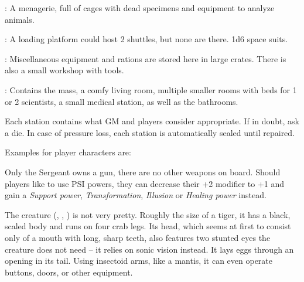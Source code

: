 {		: A menagerie, full of cages with dead specimens and equipment to analyze animals.

		: A loading platform could host 2 shuttles, but none are there. 1d6 space suits.

		: Miscellaneous equipment and rations are stored here in large crates. There is also a small workshop with tools.

		: Contains the mass, a comfy living room, multiple smaller rooms with beds for 1 or 2 scientists, a small medical station, as well as the bathrooms.

		Each station contains what GM and players consider appropriate. If in doubt, ask a die. In case of pressure loss, each station is automatically sealed until repaired.


		\noindent
		Examples for player characters are:


		\noindent
		Only the Sergeant owns a gun, there are no other weapons on board. Should players like to use PSI powers, they can decrease their +2 modifier to +1 and gain a \emph{Support power}, \emph{Transformation}, \emph{Illusion} or \emph{Healing power} instead.


		\noindent
		The creature (, , ) is not very pretty. Roughly the size of a tiger, it has a black, scaled body and runs on four crab legs. Its head, which seems at first to consist only of a mouth with long, sharp teeth, also features two stunted eyes the creature does not need -- it relies on sonic vision instead. It lays eggs through an opening in its tail. Using insectoid arms, like a mantis, it can even operate buttons, doors, or other equipment.

}
